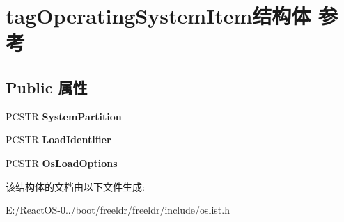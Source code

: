 \hypertarget{structtag_operating_system_item}{}\section{tag\+Operating\+System\+Item结构体 参考}
\label{structtag_operating_system_item}
\subsection*{Public 属性}
\begin{DoxyCompactItemize}
\item 
\mbox{\label{structtag_operating_system_item_a583016d75f5887f1f08f9a26ee88f216}} 
P\+C\+S\+TR {\bfseries System\+Partition}
\item 
\mbox{\label{structtag_operating_system_item_a19cd0e533fe26e2a73592653a2dd40f2}} 
P\+C\+S\+TR {\bfseries Load\+Identifier}
\item 
\mbox{\label{structtag_operating_system_item_ac6a12faf617184cc0bd1bee328ba23e6}} 
P\+C\+S\+TR {\bfseries Os\+Load\+Options}
\end{DoxyCompactItemize}


该结构体的文档由以下文件生成\+:\begin{DoxyCompactItemize}
\item 
E\+:/\+React\+O\+S-\/0../boot/freeldr/freeldr/include/oslist.\+h\end{DoxyCompactItemize}
